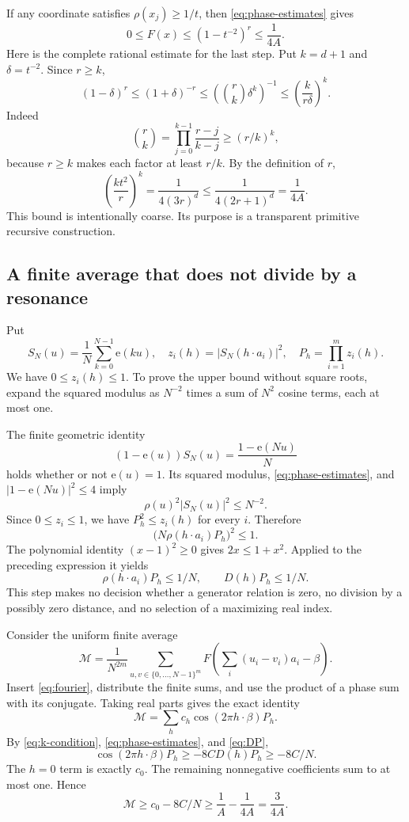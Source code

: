 \documentclass[11pt]{article}
\theoremstyle{definition}\newtheorem{definition}[theorem]{Definition}
\theoremstyle{remark}\newtheorem{remark}[theorem]{Remark}
\newcommand{\e}{\mathrm e}\newcommand{\PR}{\mathrm{PR}}
\begin{document}
If any coordinate satisfies $\rho(x_j)\ge1/t$, then \eqref{eq:phase-estimates} gives
\[
 0\le F(x)\le(1-t^{-2})^r\le\frac1{4A}.
\]
Here is the complete rational estimate for the last step. Put $k=d+1$ and $\delta=t^{-2}$. Since $r\ge k$,
\[
 (1-\delta)^r\le(1+\delta)^{-r}
 \le\left(\binom rk\delta^k\right)^{-1}
 \le\left(\frac{k}{r\delta}\right)^k.
\]
Indeed
\[
 \binom rk=\prod_{j=0}^{k-1}\frac{r-j}{k-j}\ge(r/k)^k,
\]
because $r\ge k$ makes each factor at least $r/k$. By the definition of $r$,
\begin{equation}\label{eq:kernel-tail}
 \left(\frac{kt^2}{r}\right)^k
 =\frac1{4(3r)^d}\le\frac1{4(2r+1)^d}=\frac1{4A}.
\end{equation}
This bound is intentionally coarse. Its purpose is a transparent primitive recursive construction.

\subsection{A finite average that does not divide by a resonance}

Put
\[
 S_N(u)=\frac1N\sum_{k=0}^{N-1}\e(ku),\quad
 z_i(h)=|S_N(h\cdot a_i)|^2,\quad P_h=\prod_{i=1}^m z_i(h).
\]
We have $0\le z_i(h)\le1$. To prove the upper bound without square roots, expand the squared modulus as $N^{-2}$ times a sum of $N^2$ cosine terms, each at most one.

The finite geometric identity
\[
 (1-\e(u))S_N(u)=\frac{1-\e(Nu)}N
\]
holds whether or not $\e(u)=1$. Its squared modulus, \eqref{eq:phase-estimates}, and $|1-\e(Nu)|^2\le4$ imply
\[
 \rho(u)^2|S_N(u)|^2\le N^{-2}.
\]
Since $0\le z_i\le1$, we have $P_h^2\le z_i(h)$ for every $i$. Therefore
\[
 \bigl(N\rho(h\cdot a_i)P_h\bigr)^2\le1.
\]
The polynomial identity $(x-1)^2\ge0$ gives $2x\le1+x^2$. Applied to the preceding expression it yields
\begin{equation}\label{eq:DP}
 \rho(h\cdot a_i)P_h\le1/N,
 \qquad D(h)P_h\le1/N.
\end{equation}
This step makes no decision whether a generator relation is zero, no division by a possibly zero distance, and no selection of a maximizing real index.

Consider the uniform finite average
\[
 \mathcal M=\frac1{N^{2m}}
 \sum_{u,v\in\{0,\ldots,N-1\}^m}
 F\left(\sum_i(u_i-v_i)a_i-\beta\right).
\]
Insert \eqref{eq:fourier}, distribute the finite sums, and use the product of a phase sum with its conjugate. Taking real parts gives the exact identity
\[
 \mathcal M=\sum_hc_h\cos(2\pi h\cdot\beta)P_h.
\]
By \eqref{eq:k-condition}, \eqref{eq:phase-estimates}, and \eqref{eq:DP},
\[
 \cos(2\pi h\cdot\beta)P_h
 \ge-8CD(h)P_h\ge-8C/N.
\]
The $h=0$ term is exactly $c_0$. The remaining nonnegative coefficients sum to at most one. Hence
\begin{equation}\label{eq:average-lower}
 \mathcal M\ge c_0-8C/N\ge\frac1A-\frac1{4A}=\frac3{4A}.
\end{equation}
\end{document}
